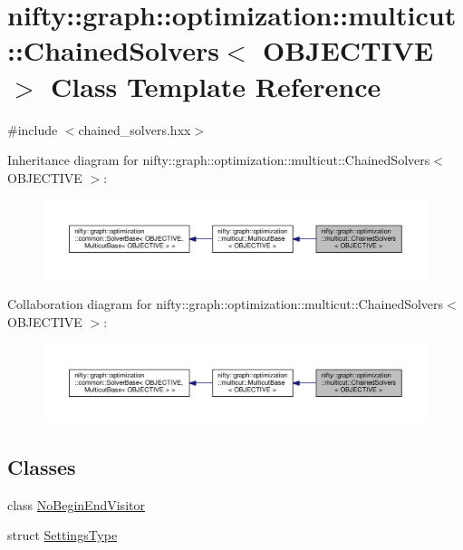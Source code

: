 \hypertarget{classnifty_1_1graph_1_1optimization_1_1multicut_1_1ChainedSolvers}{}\section{nifty\+:\+:graph\+:\+:optimization\+:\+:multicut\+:\+:Chained\+Solvers$<$ O\+B\+J\+E\+C\+T\+I\+V\+E $>$ Class Template Reference}
\label{classnifty_1_1graph_1_1optimization_1_1multicut_1_1ChainedSolvers}


{\ttfamily \#include $<$chained\+\_\+solvers.\+hxx$>$}



Inheritance diagram for nifty\+:\+:graph\+:\+:optimization\+:\+:multicut\+:\+:Chained\+Solvers$<$ O\+B\+J\+E\+C\+T\+I\+V\+E $>$\+:\nopagebreak
\begin{figure}[H]
\begin{center}
\leavevmode
\includegraphics[width=350pt]{classnifty_1_1graph_1_1optimization_1_1multicut_1_1ChainedSolvers__inherit__graph}
\end{center}
\end{figure}


Collaboration diagram for nifty\+:\+:graph\+:\+:optimization\+:\+:multicut\+:\+:Chained\+Solvers$<$ O\+B\+J\+E\+C\+T\+I\+V\+E $>$\+:\nopagebreak
\begin{figure}[H]
\begin{center}
\leavevmode
\includegraphics[width=350pt]{classnifty_1_1graph_1_1optimization_1_1multicut_1_1ChainedSolvers__coll__graph}
\end{center}
\end{figure}
\subsection*{Classes}
\begin{DoxyCompactItemize}
\item 
class \hyperlink{classnifty_1_1graph_1_1optimization_1_1multicut_1_1ChainedSolvers_1_1NoBeginEndVisitor}{No\+Begin\+End\+Visitor}
\item 
struct \hyperlink{structnifty_1_1graph_1_1optimization_1_1multicut_1_1ChainedSolvers_1_1SettingsType}{Settings\+Type}
\end{DoxyCompactItemize}
